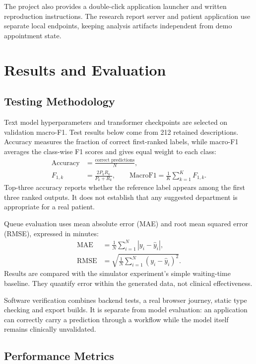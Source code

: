 \documentclass{tietreport}
\begin{document}
The project also provides a double-click application launcher and written reproduction instructions. The research report server and patient application use separate local endpoints, keeping analysis artifacts independent from demo appointment state.

\chapter{Results and Evaluation}
\section{Testing Methodology}
Text model hyperparameters and transformer checkpoints are selected on validation macro-F1. Test results below come from 212 retained descriptions. Accuracy measures the fraction of correct first-ranked labels, while macro-F1 averages the class-wise F1 scores and gives equal weight to each class:
\begin{align}
\mathrm{Accuracy} &= \frac{\text{correct predictions}}{N},\\
F_{1,k} &= \frac{2P_kR_k}{P_k+R_k},\qquad
\mathrm{MacroF1}=\frac{1}{K}\sum_{k=1}^{K}F_{1,k}.
\end{align}
Top-three accuracy reports whether the reference label appears among the first three ranked outputs. It does not establish that any suggested department is appropriate for a real patient.

Queue evaluation uses mean absolute error (MAE) and root mean squared error (RMSE), expressed in minutes:
\begin{align}
\mathrm{MAE}&=\frac{1}{N}\sum_{i=1}^{N}|y_i-\hat y_i|,\\
\mathrm{RMSE}&=\sqrt{\frac{1}{N}\sum_{i=1}^{N}(y_i-\hat y_i)^2}.
\end{align}
Results are compared with the simulator experiment's simple waiting-time baseline. They quantify error within the generated data, not clinical effectiveness.

Software verification combines backend tests, a real browser journey, static type checking and export builds. It is separate from model evaluation: an application can correctly carry a prediction through a workflow while the model itself remains clinically unvalidated.

\section{Performance Metrics}
\end{document}
